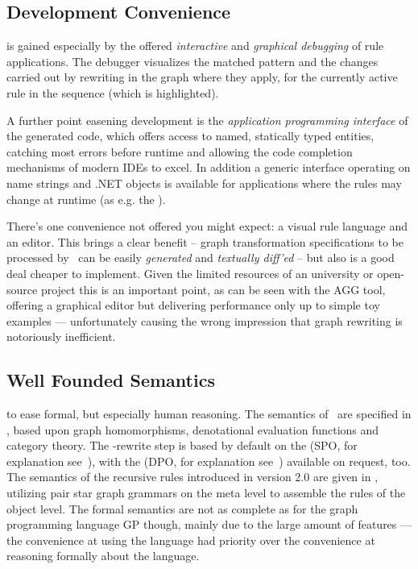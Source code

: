 \subsection*{Development Convenience}
is gained especially by the offered \emph{interactive} and \emph{graphical debugging} of rule applications.
The debugger visualizes the matched pattern and the changes carried out by rewriting in the graph where they apply,
for the currently active rule in the sequence (which is highlighted).

A further point easening development is the \emph{application programming interface} of the generated code,
which offers access to named, statically typed entities, catching most errors before runtime and allowing the code completion mechanisms of modern IDEs to excel.
In addition a generic interface operating on name strings and .NET objects is available for applications where the rules may change at runtime (as e.g. the \GrShell).

There's one convenience not offered you might expect: a visual rule language and an editor.
This brings a clear benefit -- graph transformation specifications to be processed by \GrG\ can be easily \emph{generated} and \emph{textually diff'ed} --
but also is a good deal cheaper to implement.
Given the limited resources of an university or open-source project this is an important point,
as can be seen with the AGG\cite{agg} tool, offering a graphical editor but delivering performance only up to simple toy examples
--- unfortunately causing the wrong impression that graph rewriting is notoriously inefficient.

\subsection*{Well Founded Semantics}
to ease formal, but especially human reasoning.
The semantics of \GrG\ are specified in \cite{DissRuby}, based upon graph homomorphisms, denotational evaluation functions and category theory.
The \GrG-rewrite step is based by default on the  (SPO, for explanation see~\cite{spoapproach}),
with the  (DPO, for explanation see~\cite{dpoapproach}) available on request, too.
The semantics of the recursive rules introduced in version 2.0 are given in \cite{Jak:08},
utilizing pair star graph grammars on the meta level to assemble the rules of the object level.
The formal semantics are not as complete as for the graph programming language GP\cite{gp} though, mainly due to the large amount of features
--- the convenience at using the language had priority over the convenience at reasoning formally about the language.


